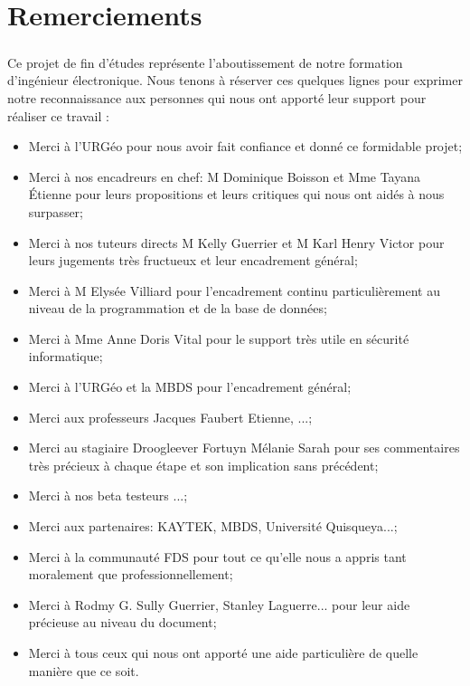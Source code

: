 \chapter*{Remerciements}
\paragraph{}
Ce projet de fin d’études représente l'aboutissement de notre formation d’ingénieur électronique. 
Nous tenons à réserver ces quelques lignes pour exprimer notre
reconnaissance aux personnes qui nous ont apporté leur support pour réaliser ce travail :

\begin{itemize}
    \item Merci à l'URGéo pour nous avoir fait confiance et donné ce formidable projet;\par
    \item Merci à nos encadreurs en chef: M Dominique Boisson et Mme Tayana Étienne pour 
    leurs propositions et leurs critiques qui nous ont aidés à nous surpasser; \par
    \item Merci à nos tuteurs directs M Kelly Guerrier et M Karl Henry Victor pour leurs 
    jugements très fructueux et leur encadrement général;\par
    \item Merci à  M Elysée Villiard pour l'encadrement continu particulièrement
    au niveau de la programmation et de la base de données;\par
    \item Merci à Mme Anne Doris Vital pour le support très utile en sécurité informatique;\par
    \item Merci à l'URGéo et la MBDS pour l'encadrement général;\par
    \item Merci aux professeurs Jacques Faubert Etienne, ...;\par
    \item Merci au stagiaire Droogleever Fortuyn Mélanie Sarah pour ses commentaires 
    très précieux à chaque étape et son implication sans précédent; \par
    \item Merci à nos beta testeurs ...;\par
    \item Merci aux partenaires: KAYTEK, MBDS, Université Quisqueya...;\par
    \item Merci à la communauté FDS pour tout ce qu'elle nous a appris tant 
    moralement que professionnellement;\par
    \item Merci à Rodmy G. Sully Guerrier, Stanley Laguerre... pour leur aide précieuse 
    au niveau du document; \par
    \item Merci à tous ceux qui nous ont apporté une aide particulière de quelle manière 
    que ce soit. \par 
\end{itemize}
